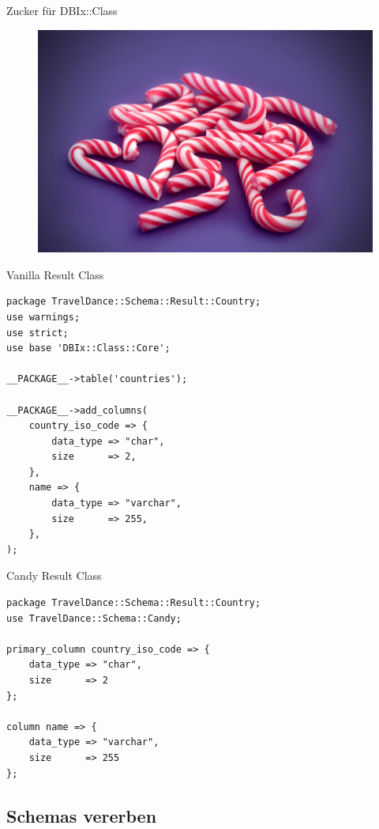 \begin{frame}{Zucker für DBIx::Class}
\begin{figure}[!ht]
\centering
\includegraphics[width=0.8\linewidth]{img/candy-cane.jpg}
\end{figure}
\end{frame}

\begin{frame}[fragile]{Vanilla Result Class}
\begin{lstlisting}
package TravelDance::Schema::Result::Country;
use warnings;
use strict;
use base 'DBIx::Class::Core';

__PACKAGE__->table('countries');

__PACKAGE__->add_columns(
    country_iso_code => {
        data_type => "char",
        size      => 2,
    },
    name => {
        data_type => "varchar",
        size      => 255,
    },
);
\end{lstlisting}
\end{frame}

\begin{frame}[fragile]{Candy Result Class}
\begin{lstlisting}
package TravelDance::Schema::Result::Country;
use TravelDance::Schema::Candy;

primary_column country_iso_code => {
    data_type => "char",
    size      => 2
};

column name => {
    data_type => "varchar",
    size      => 255
};
\end{lstlisting}
\end{frame}

\subsection{Schemas vererben}

